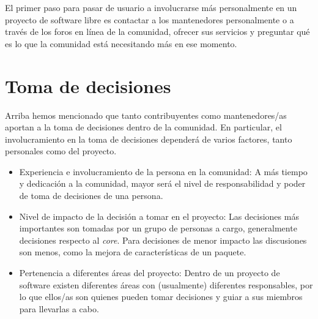 El primer paso para pasar de usuario a involucrarse más personalmente en un proyecto de software libre es contactar a los mantenedores personalmente o a través de los foros en línea de la comunidad, ofrecer sus servicios y preguntar qué es lo que la comunidad está necesitando más en ese momento.



\section{Toma de decisiones}

Arriba hemos mencionado que tanto contribuyentes como mantenedores/as aportan a la toma de decisiones dentro de la comunidad. En particular, el involucramiento en la toma de decisiones dependerá de varios factores, tanto personales como del proyecto.

\begin{itemize}
     \item Experiencia e involucramiento de la persona en la comunidad: A más tiempo y dedicación a la comunidad, mayor será el nivel de responsabilidad y poder de toma de decisiones de una persona.
     \item Nivel de impacto de la decisión a tomar en el proyecto: Las decisiones más importantes son tomadas por un grupo de personas a cargo, generalmente decisiones respecto al \emph{core}. Para decisiones de menor impacto las discusiones son menos, como la mejora de características de un paquete.
     \item Pertenencia a diferentes áreas del proyecto: Dentro de un proyecto de software existen diferentes áreas con (usualmente) diferentes responsables, por lo que ellos/as son quienes pueden tomar decisiones y guiar a sus miembros para llevarlas a cabo.
\end{itemize}

